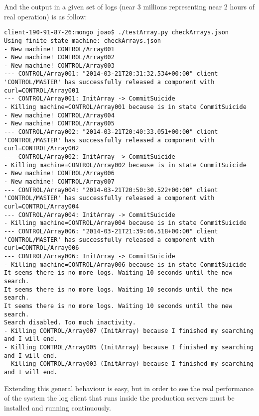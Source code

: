 \documentclass[]{spie}  %
\begin{document}
And the output in a given set of logs (near 3 millions representing near 2 hours of real operation) is as follow:
\begin{verbatim}
client-190-91-87-26:mongo joao$ ./testArray.py checkArrays.json
Using finite state machine: checkArrays.json
- New machine! CONTROL/Array001
- New machine! CONTROL/Array002
- New machine! CONTROL/Array003
--- CONTROL/Array001: "2014-03-21T20:31:32.534+00:00" client 'CONTROL/MASTER' has successfully released a component with curl=CONTROL/Array001
--- CONTROL/Array001: InitArray -> CommitSuicide
- Killing machine=CONTROL/Array001 because is in state CommitSuicide
- New machine! CONTROL/Array004
- New machine! CONTROL/Array005
--- CONTROL/Array002: "2014-03-21T20:40:33.051+00:00" client 'CONTROL/MASTER' has successfully released a component with curl=CONTROL/Array002
--- CONTROL/Array002: InitArray -> CommitSuicide
- Killing machine=CONTROL/Array002 because is in state CommitSuicide
- New machine! CONTROL/Array006
- New machine! CONTROL/Array007
--- CONTROL/Array004: "2014-03-21T20:50:30.522+00:00" client 'CONTROL/MASTER' has successfully released a component with curl=CONTROL/Array004
--- CONTROL/Array004: InitArray -> CommitSuicide
- Killing machine=CONTROL/Array004 because is in state CommitSuicide
--- CONTROL/Array006: "2014-03-21T21:39:46.518+00:00" client 'CONTROL/MASTER' has successfully released a component with curl=CONTROL/Array006
--- CONTROL/Array006: InitArray -> CommitSuicide
- Killing machine=CONTROL/Array006 because is in state CommitSuicide
It seems there is no more logs. Waiting 10 seconds until the new search.
It seems there is no more logs. Waiting 10 seconds until the new search.
It seems there is no more logs. Waiting 10 seconds until the new search.
Search disabled. Too much inactivity.
- Killing CONTROL/Array007 (InitArray) because I finished my searching and I will end.
- Killing CONTROL/Array005 (InitArray) because I finished my searching and I will end.
- Killing CONTROL/Array003 (InitArray) because I finished my searching and I will end.
\end{verbatim}

Extending this general behaviour is easy, but in order to see the real
performance of the system the log client that runs inside the production
servers must be installed and running continuously.
\end{document}
